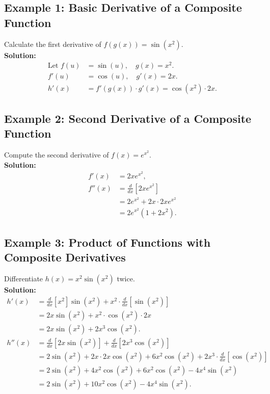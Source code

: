 \documentclass{article}
\begin{document}
\subsection{Example 1: Basic Derivative of a Composite Function}
Calculate the first derivative of $f(g(x)) = \sin(x^2)$. \\
\textbf{Solution:}
\begin{align*}
\text{Let } f(u) &= \sin(u), \quad g(x) = x^2. \\
f'(u) &= \cos(u), \quad g'(x) = 2x. \\
h'(x) &= f'(g(x)) \cdot g'(x) = \cos(x^2) \cdot 2x.
\end{align*}

\subsection{Example 2: Second Derivative of a Composite Function}
Compute the second derivative of $f(x) = e^{x^2}$. \\
\textbf{Solution:}
\begin{align*}
f'(x) &= 2x e^{x^2}, \\
f''(x) &= \frac{d}{dx}[2x e^{x^2}] \\
&= 2 e^{x^2} + 2x \cdot 2x e^{x^2} \\
&= 2e^{x^2}(1 + 2x^2).
\end{align*}

\subsection{Example 3: Product of Functions with Composite Derivatives}
Differentiate $h(x) = x^2 \sin(x^2)$ twice. \\
\textbf{Solution:}
\begin{align*}
h'(x) &= \frac{d}{dx}[x^2] \sin(x^2) + x^2 \cdot \frac{d}{dx}[\sin(x^2)] \\
&= 2x \sin(x^2) + x^2 \cdot \cos(x^2) \cdot 2x \\
&= 2x \sin(x^2) + 2x^3 \cos(x^2). \\
h''(x) &= \frac{d}{dx}[2x \sin(x^2)] + \frac{d}{dx}[2x^3 \cos(x^2)] \\
&= 2 \sin(x^2) + 2x \cdot 2x \cos(x^2) + 6x^2 \cos(x^2) + 2x^3 \cdot \frac{d}{dx}[\cos(x^2)] \\
&= 2 \sin(x^2) + 4x^2 \cos(x^2) + 6x^2 \cos(x^2) - 4x^4 \sin(x^2) \\
&= 2 \sin(x^2) + 10x^2 \cos(x^2) - 4x^4 \sin(x^2).
\end{align*}
\end{document}

